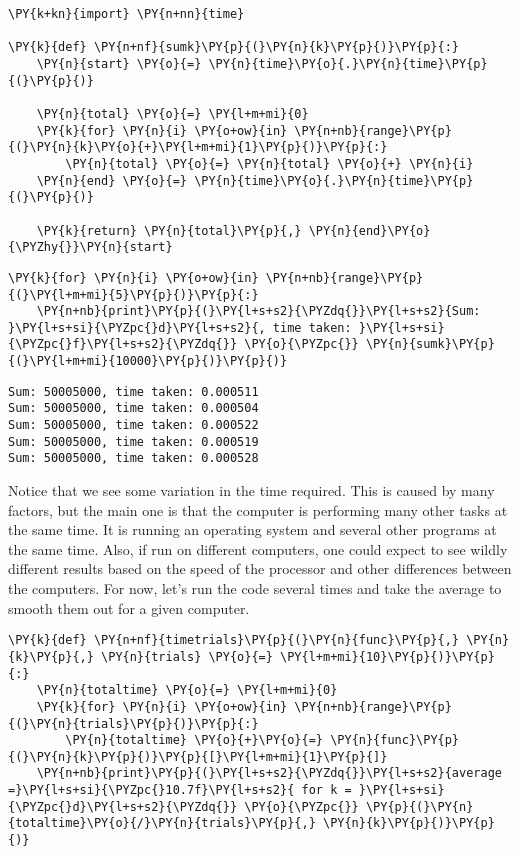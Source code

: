 \begin{Verbatim}[commandchars=\\\{\}]
\PY{k+kn}{import} \PY{n+nn}{time}

\PY{k}{def} \PY{n+nf}{sumk}\PY{p}{(}\PY{n}{k}\PY{p}{)}\PY{p}{:}
    \PY{n}{start} \PY{o}{=} \PY{n}{time}\PY{o}{.}\PY{n}{time}\PY{p}{(}\PY{p}{)}

    \PY{n}{total} \PY{o}{=} \PY{l+m+mi}{0}
    \PY{k}{for} \PY{n}{i} \PY{o+ow}{in} \PY{n+nb}{range}\PY{p}{(}\PY{n}{k}\PY{o}{+}\PY{l+m+mi}{1}\PY{p}{)}\PY{p}{:}
        \PY{n}{total} \PY{o}{=} \PY{n}{total} \PY{o}{+} \PY{n}{i}
    \PY{n}{end} \PY{o}{=} \PY{n}{time}\PY{o}{.}\PY{n}{time}\PY{p}{(}\PY{p}{)}

    \PY{k}{return} \PY{n}{total}\PY{p}{,} \PY{n}{end}\PY{o}{\PYZhy{}}\PY{n}{start}
\end{Verbatim}



\begin{Verbatim}[commandchars=\\\{\}]
\PY{k}{for} \PY{n}{i} \PY{o+ow}{in} \PY{n+nb}{range}\PY{p}{(}\PY{l+m+mi}{5}\PY{p}{)}\PY{p}{:}
    \PY{n+nb}{print}\PY{p}{(}\PY{l+s+s2}{\PYZdq{}}\PY{l+s+s2}{Sum: }\PY{l+s+si}{\PYZpc{}d}\PY{l+s+s2}{, time taken: }\PY{l+s+si}{\PYZpc{}f}\PY{l+s+s2}{\PYZdq{}} \PY{o}{\PYZpc{}} \PY{n}{sumk}\PY{p}{(}\PY{l+m+mi}{10000}\PY{p}{)}\PY{p}{)}
\end{Verbatim}

\begin{Verbatim}
Sum: 50005000, time taken: 0.000511
Sum: 50005000, time taken: 0.000504
Sum: 50005000, time taken: 0.000522
Sum: 50005000, time taken: 0.000519
Sum: 50005000, time taken: 0.000528

\end{Verbatim}


Notice that we see some variation in the time required.
This is caused by many factors, but the main one is that the computer is performing many other tasks at the same time.
It is running an operating system and several other programs at the same time.
Also, if run on different computers, one could expect to see wildly different results based on the speed of the processor and other differences between the computers.
For now, let's run the code several times and take the average to smooth them out for a given computer.

\begin{Verbatim}[commandchars=\\\{\}]
\PY{k}{def} \PY{n+nf}{timetrials}\PY{p}{(}\PY{n}{func}\PY{p}{,} \PY{n}{k}\PY{p}{,} \PY{n}{trials} \PY{o}{=} \PY{l+m+mi}{10}\PY{p}{)}\PY{p}{:}
    \PY{n}{totaltime} \PY{o}{=} \PY{l+m+mi}{0}
    \PY{k}{for} \PY{n}{i} \PY{o+ow}{in} \PY{n+nb}{range}\PY{p}{(}\PY{n}{trials}\PY{p}{)}\PY{p}{:}
        \PY{n}{totaltime} \PY{o}{+}\PY{o}{=} \PY{n}{func}\PY{p}{(}\PY{n}{k}\PY{p}{)}\PY{p}{[}\PY{l+m+mi}{1}\PY{p}{]}
    \PY{n+nb}{print}\PY{p}{(}\PY{l+s+s2}{\PYZdq{}}\PY{l+s+s2}{average =}\PY{l+s+si}{\PYZpc{}10.7f}\PY{l+s+s2}{ for k = }\PY{l+s+si}{\PYZpc{}d}\PY{l+s+s2}{\PYZdq{}} \PY{o}{\PYZpc{}} \PY{p}{(}\PY{n}{totaltime}\PY{o}{/}\PY{n}{trials}\PY{p}{,} \PY{n}{k}\PY{p}{)}\PY{p}{)}
\end{Verbatim}



